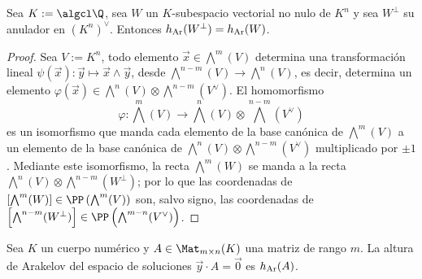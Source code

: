 \documentclass[teoria-numeros.tex]{subfiles}
\begin{document}
\begin{prop}
	Sea $K := \algcl\Q$, sea $W$ un $K$-subespacio vectorial no nulo de $K^n$ y sea $W^\perp$ su anulador en $(K^n)^\vee$.
	Entonces $h_{\mathrm{Ar}}(W^\perp) = h_{\mathrm{Ar}}(W)$.
\end{prop}
\begin{proof}
	Sea $V := K^n$, todo elemento $\vec x \in \bigwedge^m(V)$ determina una transformación lineal $\psi(\vec x) \colon \vec y \mapsto \vec x \wedge \vec y$,
	desde $\bigwedge^{n-m}(V) \to \bigwedge^n(V)$, es decir, determina un elemento $\varphi(\vec x) \in \bigwedge^n(V) \otimes \bigwedge^{n-m}(V^\vee)$.
	El homomorfismo
	$$ \varphi \colon \bigwedge^m(V) \longrightarrow \bigwedge^n(V) \otimes \bigwedge^{n-m}(V^\vee) $$
	es un isomorfismo que manda cada elemento de la base canónica de $\bigwedge^m(V)$ a un elemento
	de la base canónica de $\bigwedge^n(V) \otimes \bigwedge^{n-m}(V^\vee)$ multiplicado por $\pm 1$.
	Mediante este isomorfismo, la recta $\bigwedge^m(W)$ se manda a la recta $\bigwedge^n(V) \otimes \bigwedge^{n-m}(W^\perp)$;
	por lo que las coordenadas de $\left[ \bigwedge^m(W) \right] \in \PP\left( \bigwedge^m(V) \right)$ son, salvo signo,
	las coordenadas de $\left[ \bigwedge^{n-m}(W^\perp) \right] \in \PP\left( \bigwedge^{m-n}(V^\vee) \right)$.
\end{proof}
\begin{cor}\label{thm:arak_hgt_duality}
	Sea $K$ un cuerpo numérico y $A \in \Mat_{m\times n}(K)$ una matriz de rango $m$.
	La altura de Arakelov del espacio de soluciones $\vec y\cdot A = \Vec 0$ es $h_{\mathrm{Ar}}(A)$.
\end{cor}
\end{document}
